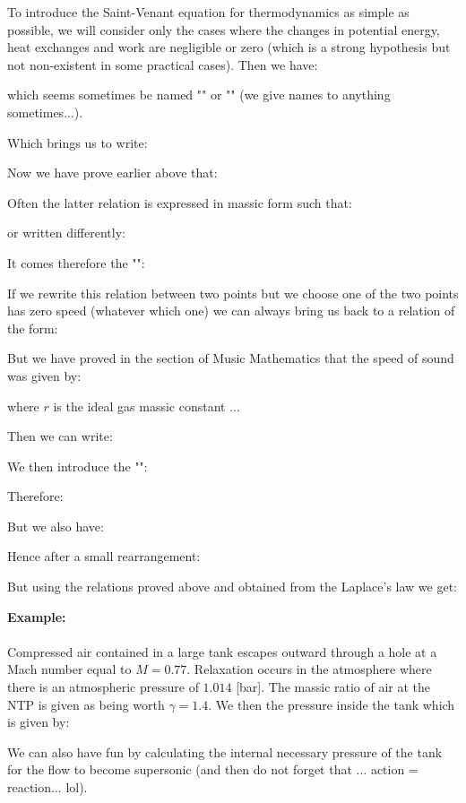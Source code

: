 	To introduce the Saint-Venant equation for thermodynamics as simple as possible, we will consider only the cases where the changes in potential energy, heat exchanges and work are negligible or zero (which is a strong hypothesis but not non-existent in some practical cases). Then we have:
	
	which seems sometimes be named "" or "" (we give names to anything sometimes...).
	
	Which brings us to write:
	
	Now we have prove earlier above that:
	
	Often the latter relation is expressed in massic form such that:
	
	or written differently:
	
	It comes therefore the "":
	
	If we rewrite this relation between two points but we choose one of the two points has zero speed (whatever which one) we can always bring us back to a relation of the form:
	
	But we have proved in the section of Music Mathematics that the speed of sound was given by:
	
	where $r$ is the ideal gas massic constant ...

	Then we can write:
	
	We then introduce the "":
	
	Therefore:
	
	But we also have:
	
	Hence after a small rearrangement:
	
	But using the relations proved above and obtained from the Laplace's law we get:
	
	
	\begin{tcolorbox}[colframe=black,colback=white,sharp corners]
	\textbf{{\Large {}}Example:}\\\\
	Compressed air contained in a large tank escapes outward through a hole at a Mach number equal to $M=0.77$. Relaxation occurs in the atmosphere where there is an atmospheric pressure of $1.014$ [bar]. The massic ratio of air at the NTP is given as being worth $\gamma=1.4$. We then the pressure inside the tank which is given by:
	
	We can also have fun by calculating the internal necessary pressure of the tank for the flow to become supersonic (and then do not forget that ... action = reaction... lol).
	\end{tcolorbox}
	
